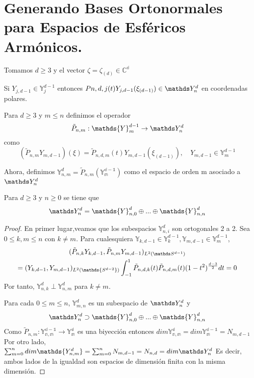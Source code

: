 \section{Generando Bases Ortonormales para Espacios de Esféricos Armónicos.}
Tomamos $d\ge3$ y el vector $\zeta = \zeta_{(d)} \in \mathds{C^{d}}$ 
\begin{prop}Si $Y_{j,d-1}\in\mathds{Y}_j^{d-1}$ entonces $P{n,d,j}(t)Y_{j,d-1}(\xi_{(d-1)})\in\spharm$ en coordenadas polares.
\end{prop}
\begin{defn}
Para $d\ge3$ y $m\le n$ definimos el operador $$ \tilde{P}_{n,m} : \mathds{Y}_m^{d-1} \to \spharm
$$
como
$$
(\tilde{P}_{n,m}Y_{m,d-1})(\xi) = \tilde{P}_{n,d,m}(t)Y_{m,d-1}(\xi_{(d-1)}), \quad Y_{m,d-1} \in \mathds{Y}_m^{d-1}
$$
\end{defn}
Ahora, definimos $\mathds{Y}^d_{n,m} = \tilde{P}_{n,m}(\mathds{Y_{m}^{d-1}})$ como el espacio de orden m asociado a $\spharm$
\begin{thm}Para $d\ge 3$ y $n\ge 0$ se tiene que $$
	\spharm = \mathds{Y}^d_{n,0} \oplus ... \oplus \mathds{Y}^d_{n,n}
$$
\end{thm}
\begin{proof}
En primer lugar,veamos que los subespacios $\mathds{Y}^d_{n,i}$ son ortogonales 2 a 2. Sea $0\le k,m\le n$ con $k \neq m$. Para cualesquiera $\mathds{Y}_{k,d-1}\in\mathds{Y}_k^{d-1},\mathds{Y}_{m,d-1}\in\mathds{Y}_m^{d-1}$,
\begin{gather}
(\tilde{P}_{n,k}Y_{k,d-1},\tilde{P}_{n,m}Y_{m,d-1})_{L^2(\sphere)} \\= (Y_{k,d-1},Y_{m,d-1})_{L^2(\mathds{S^{d-2}})}\int_{-1}^{1} \tilde{P}_{n,d,k}(t)\tilde{P}_{n,d,m}(t)(1-t^2)^{\frac{d-3}{2}}dt = 0
\end{gather}
Por tanto, $\mathds{Y}^d_{n,k}\perp\mathds{Y}^d_{n,m}$ para $k\neq m$.

Para cada $0\le m\le n$, $\mathds{Y}^d_{m,n}$ es un subespacio de $\spharm$ y $$
\spharm \supset \mathds{Y}^d_{n,0} \oplus ... \oplus \mathds{Y}^d_{n,n}$$
Como $\tilde{P}_{n,m}:\mathds{Y_{n,m}^{d-1}} \to \mathds{Y_{m}^{d}}$ es una biyección entonces $dim \mathds{Y_{n,m}^{d}} = dim \mathds{Y_{m}^{d-1}} = N_{m,d-1}$
Por otro lado, $\sum_{m=0}^{n} dim \mathds{Y_{n,m}^{d}} = \sum_{m=0}^{n} N_{m,d-1} =  N_{n,d} = dim \spharm$
Es decir, ambos lados de la igualdad son espacios de dimensión finita con la misma dimensión.
\end{proof}
\appendix
